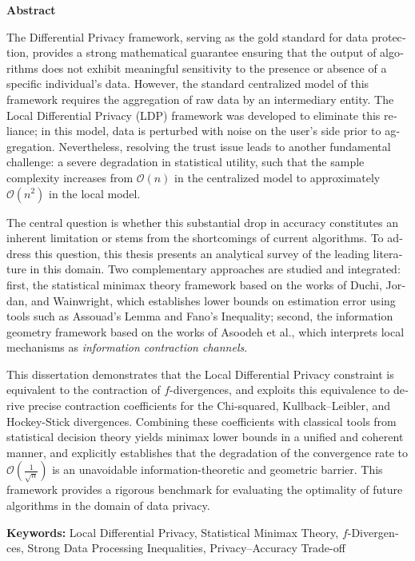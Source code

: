 

\begin{latin}
\begin{center}
    \textbf{Abstract}
\end{center}

The Differential Privacy framework, serving as the gold standard for data 
protection, provides a strong mathematical guarantee ensuring that the output 
of algorithms does not exhibit meaningful sensitivity to the presence or absence 
of a specific individual's data. However, the standard centralized model of this 
framework requires the aggregation of raw data by an intermediary entity. The 
Local Differential Privacy (LDP) framework was developed to eliminate this 
reliance; in this model, data is perturbed with noise on the user's side prior 
to aggregation. Nevertheless, resolving the trust issue leads to another 
fundamental challenge: a severe degradation in statistical utility, such that 
the sample complexity increases from $\mathcal{O}(n)$ in the centralized model 
to approximately $\mathcal{O}(n^2)$ in the local model.

The central question is whether this substantial drop in accuracy constitutes 
an inherent limitation or stems from the shortcomings of current algorithms. 
To address this question, this thesis presents an analytical survey of the 
leading literature in this domain. Two complementary approaches are studied 
and integrated: first, the statistical minimax theory framework based on the 
works of Duchi, Jordan, and Wainwright, which establishes lower bounds on 
estimation error using tools such as Assouad's Lemma and Fano's Inequality; 
second, the information geometry framework based on the works of Asoodeh et 
al., which interprets local mechanisms as \textit{information contraction 
channels}.

This dissertation demonstrates that the Local Differential Privacy constraint 
is equivalent to the contraction of $f$-divergences, and exploits this 
equivalence to derive precise contraction coefficients for the Chi-squared, 
Kullback--Leibler, and Hockey-Stick divergences. Combining these coefficients 
with classical tools from statistical decision theory yields minimax lower 
bounds in a unified and coherent manner, and explicitly establishes that the 
degradation of the convergence rate to $\mathcal{O}\!\left(\frac{1}{\sqrt{n}}\right)$ 
is an unavoidable information-theoretic and geometric barrier. This framework 
provides a rigorous benchmark for evaluating the optimality of future 
algorithms in the domain of data privacy.

\vspace{2em}
\noindent\textbf{Keywords:} Local Differential Privacy, Statistical Minimax     
Theory, $f$-Divergences, Strong Data Processing Inequalities, 
Privacy--Accuracy Trade-off


\end{latin}

